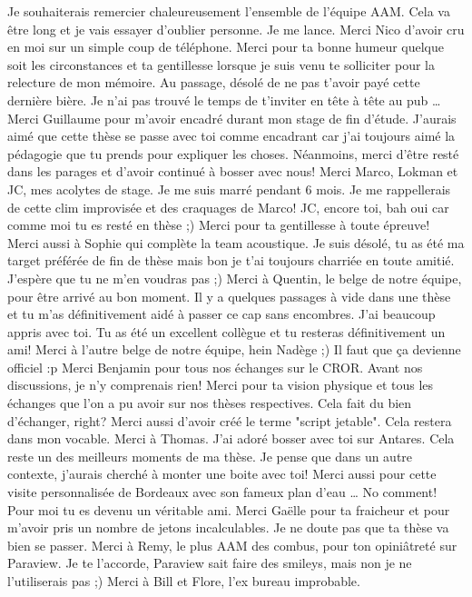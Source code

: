 Je souhaiterais remercier chaleureusement
l'ensemble de l'équipe AAM. Cela va être long et je vais
essayer d'oublier personne. Je me lance. 
Merci Nico d'avoir cru en moi sur un simple coup
de téléphone. Merci pour ta bonne humeur quelque soit les
circonstances et ta gentillesse lorsque je suis venu te solliciter
pour la relecture de mon mémoire. Au passage, désolé de ne pas
t'avoir payé cette dernière bière. Je n'ai pas trouvé le temps de t'inviter
en tête à tête au pub \ldots{} Merci Guillaume pour m'avoir encadré
durant mon stage de fin d'étude. J'aurais aimé que cette thèse se passe avec toi comme
encadrant car j'ai toujours aimé la pédagogie que
tu prends pour expliquer les choses. 
Néanmoins, merci d'être resté dans les parages et d'avoir
continué à bosser avec nous!
Merci Marco, Lokman
et JC, mes acolytes de stage. Je me suis marré pendant 6 mois.
Je me rappellerais de cette clim improvisée et des craquages de Marco!
JC, encore toi, bah oui car comme moi tu es resté en thèse ;)
Merci pour ta gentillesse à toute épreuve! Merci aussi à Sophie qui complète
la team acoustique. Je suis désolé, tu as été ma target préférée
de fin de thèse mais bon je t'ai toujours charriée en toute amitié.
J'espère que tu ne m'en voudras pas ;)
Merci à Quentin, le belge de notre équipe, pour être arrivé au bon moment.
Il y a quelques passages à vide dans une thèse et tu m'as définitivement
aidé à passer ce cap sans encombres.
J'ai beaucoup appris avec toi. Tu as été un excellent collègue
et tu resteras définitivement un ami!
Merci à l'autre belge de notre équipe, hein Nadège ;)
Il faut que ça devienne officiel :p
Merci Benjamin
pour tous nos échanges sur le CROR. Avant nos discussions, je n'y
comprenais rien! Merci pour ta vision physique et tous les échanges
que l'on a pu avoir sur nos thèses respectives. Cela fait du bien
d'échanger, right? Merci aussi d'avoir créé le terme "script jetable".
Cela restera dans mon vocable. Merci à Thomas. J'ai adoré bosser avec
toi sur Antares. Cela reste un des meilleurs moments
de ma thèse. Je pense que dans un autre contexte, j'aurais cherché à
monter une boite avec toi! Merci aussi pour cette visite personnalisée
de Bordeaux avec son fameux plan d'eau \ldots{} No comment! Pour moi tu es
devenu un véritable ami. Merci Gaëlle
pour ta fraicheur et pour m'avoir pris un nombre de jetons incalculables.
Je ne doute pas que ta thèse va bien se passer.
Merci à Remy, le plus AAM des combus, pour ton opiniâtreté sur Paraview.
Je te l'accorde, Paraview sait faire des smileys, 
mais non je ne l'utiliserais pas ;)
Merci à Bill et Flore, l'ex bureau improbable. 
